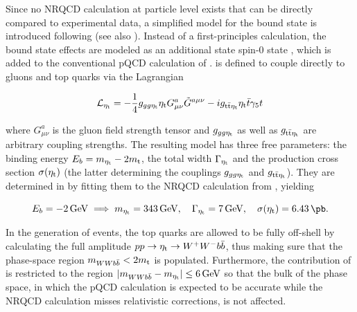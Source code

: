 Since no NRQCD calculation at particle level exists that can be directly compared to experimental data, a simplified model for the \ttbar bound state is introduced following  (see also ). Instead of a first-principles calculation, the bound state effects are modeled as an additional state spin-0 state \etat, which is added to the conventional pQCD calculation of \ttbar. \etat is defined to couple directly to gluons and top quarks via the Lagrangian

\begin{equation}
  \mathcal{L}_{\mathrm{\eta_t}} = - \frac{1}{4} g_{gg \mathrm{\eta_t}} \mathrm{\eta_t} G^{a}_{\mu \nu} \tilde{G}^{a \mu \nu} - i g_{\mathrm{t \bar{t}} \mathrm{\eta_t}} \mathrm{\eta_t} \bar{t} \gamma_5 t
\end{equation}

\noindent where $G^{a}_{\mu \nu}$ is the gluon field strength tensor and $g_{gg \mathrm{\eta_t}}$ as well as $g_{\mathrm{t \bar{t}} \mathrm{\eta_t}}$ are arbitrary coupling strengths. The resulting model has three free parameters: the binding energy $E_b = m_{\mathrm{\eta_t}} - 2 m_{\mathrm{t}}$, the total width $\Gamma_{\mathrm{\eta_t}}$ and the production cross section $\sigma(\mathrm{\eta_t})$ (the latter determining the couplings $g_{gg \mathrm{\eta_t}}$ and $g_{\mathrm{t \bar{t}} \mathrm{\eta_t}}$). They are determined in  by fitting them to the NRQCD calculation from , yielding

\begin{equation}
  \label{eq:theory:etatparams}
  E_b = \SI{-2}{\GeV} \implies m_{\etat} = \SI{343}{\GeV}, \quad \Gamma_{\etat} = \SI{7}{\GeV}, \quad \sigma(\etat) = \SI{6.43}{\pb}.
\end{equation}

In the generation of events, the top quarks are allowed to be fully off-shell by calculating the full amplitude $p p \rightarrow \mathrm{\eta_t} \rightarrow W^+ W^- b \bar{b}$, thus making sure that the phase-space region $m_{WWb\bar{b}} < 2 m_{\mathrm{t}}$ is populated. Furthermore, the contribution of \etat is restricted to the region $|m_{WWb\bar{b}} - m_{\mathrm{\eta_t}}| \leq \SI{6}{GeV}$ so that the bulk of the \ttbar phase space, in which the pQCD calculation is expected to be accurate while the NRQCD calculation misses relativistic corrections, is not affected.

